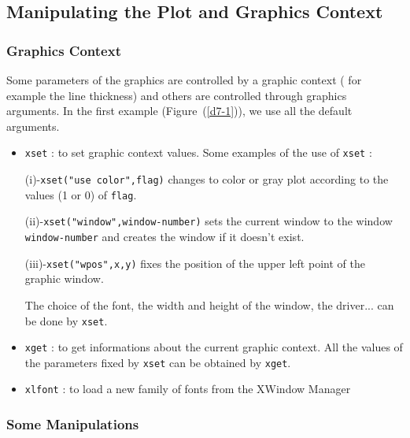 \subsection{Manipulating the Plot and Graphics Context}
\subsubsection{Graphics Context}

Some parameters of the graphics are controlled by a graphic context 
( for example the line thickness) and others are controlled through
graphics arguments. In the first example (Figure~(\ref{d7-1})),
we use all the default arguments.
%
\begin{itemize}
	\item  {\tt xset}	: to set graphic context values.
Some examples of the use of {\tt xset} : 

(i)-{\tt xset("use color",flag)} changes to color or gray plot according to 
the values (1 or 0) of {\tt flag}.

(ii)-{\tt xset("window",window-number)} sets the current window to the window 
{\tt window-number} and creates the window if it doesn't exist.

(iii)-{\tt xset("wpos",x,y)} fixes the position of the upper left point of 
the graphic window.

The choice of the font, the width and height of the window, the driver...
can be done by {\tt xset}.

	\item  {\tt xget}	: to get informations about the current graphic context.
All the values of the parameters fixed by {\tt xset} can be obtained by 
{\tt xget}.

        \item  {\tt xlfont}	: to load a new family of fonts from the XWindow Manager
\end{itemize}
%

\subsubsection{Some Manipulations}

